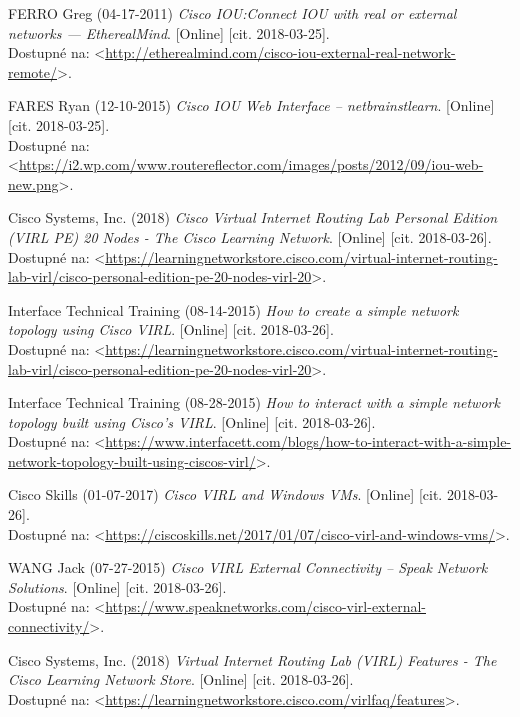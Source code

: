 \begin{thebibliography}{99}
FERRO Greg (04-17-2011) {\it Cisco IOU:Connect IOU with real or external networks — EtherealMind}. [Online] [cit. 2018-03-25]. \\
Dostupné na: <\url{http://etherealmind.com/cisco-iou-external-real-network-remote/}>.

FARES Ryan (12-10-2015) {\it Cisco IOU Web Interface – netbrainstlearn}. [Online] [cit. 2018-03-25]. \\
Dostupné na: <\url{https://i2.wp.com/www.routereflector.com/images/posts/2012/09/iou-web-new.png}>.

Cisco Systems, Inc. (2018) {\it Cisco Virtual Internet Routing Lab Personal Edition (VIRL PE) 20 Nodes - The Cisco Learning Network}. [Online] [cit. 2018-03-26]. \\
Dostupné na: <\url{https://learningnetworkstore.cisco.com/virtual-internet-routing-lab-virl/cisco-personal-edition-pe-20-nodes-virl-20}>.

Interface Technical Training (08-14-2015) {\it How to create a simple network topology using Cisco VIRL}. [Online] [cit. 2018-03-26]. \\
Dostupné na: <\url{https://learningnetworkstore.cisco.com/virtual-internet-routing-lab-virl/cisco-personal-edition-pe-20-nodes-virl-20}>.

Interface Technical Training (08-28-2015) {\it How to interact with a simple network topology built using Cisco’s VIRL}. [Online] [cit. 2018-03-26]. \\
Dostupné na: <\url{https://www.interfacett.com/blogs/how-to-interact-with-a-simple-network-topology-built-using-ciscos-virl/}>.

Cisco Skills (01-07-2017) {\it Cisco VIRL and Windows VMs}. [Online] [cit. 2018-03-26]. \\
Dostupné na: <\url{https://ciscoskills.net/2017/01/07/cisco-virl-and-windows-vms/}>.

WANG Jack (07-27-2015) {\it Cisco VIRL External Connectivity – Speak Network Solutions}. [Online] [cit. 2018-03-26]. \\
Dostupné na: <\url{https://www.speaknetworks.com/cisco-virl-external-connectivity/}>.

Cisco Systems, Inc. (2018) {\it Virtual Internet Routing Lab (VIRL) Features - The Cisco Learning Network Store}. [Online] [cit. 2018-03-26]. \\
Dostupné na: <\url{https://learningnetworkstore.cisco.com/virlfaq/features}>.


\end{thebibliography}
